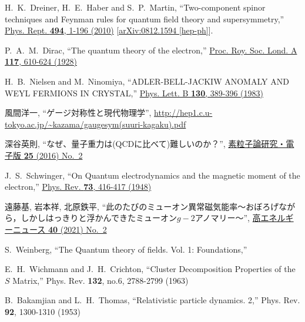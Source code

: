 \documentclass[10pt,a4paper]{jarticle}
\begin{document}
\begin{thebibliography}{99}
H.~K.~Dreiner, H.~E.~Haber and S.~P.~Martin,
``Two-component spinor techniques and Feynman rules for quantum field theory and supersymmetry,''
\href{https://doi.org/10.1016/j.physrep.2010.05.002}{Phys. Rept. \textbf{494}, 1-196 (2010)}
[\href{https://arxiv.org/abs/0812.1594}{arXiv:0812.1594 [hep-ph]}].

P.~A.~M.~Dirac,
``The quantum theory of the electron,''
\href{https://doi.org/10.1098/rspa.1928.0023}{Proc. Roy. Soc. Lond. A \textbf{117}, 610-624 (1928)}

H.~B.~Nielsen and M.~Ninomiya,
``ADLER-BELL-JACKIW ANOMALY AND WEYL FERMIONS IN CRYSTAL,''
\href{https://doi.org/10.1016/0370-2693(83)91529-0}{Phys. Lett. B \textbf{130}, 389-396 (1983)}

風間洋一, ``ゲージ対称性と現代物理学'',
\url{http://hep1.c.u-tokyo.ac.jp/~kazama/gaugesym(suuri-kagaku).pdf}

深谷英則, ``なぜ、量子重力は(QCDに比べて)難しいのか？'',
\href{http://www2.yukawa.kyoto-u.ac.jp/~soken.editorial/sokendenshi/vol25/sokendenshi_2016_25_2.html}
{素粒子論研究・電子版 \textbf{25} (2016) No.~2}

J.~S.~Schwinger,
``On Quantum electrodynamics and the magnetic moment of the electron,''
\href{https://doi.org/10.1103/PhysRev.73.416}{Phys. Rev. \textbf{73}, 416-417 (1948)}

遠藤基, 岩本祥, 北原鉄平,
``此のたびのミューオン異常磁気能率〜おぼろげながら，しかしはっきりと浮かんできたミューオン$g-2$アノマリー〜'',
\href{http://www.jahep.org/hepnews/2021/40-2-2-g2.pdf}{高エネルギーニュース \textbf{40} (2021) No.~2}

S.~Weinberg,
``The Quantum theory of fields. Vol. 1: Foundations,''

E.~H.~Wichmann and J.~H.~Crichton,
``Cluster Decomposition Properties of the $S$ Matrix,''
Phys. Rev. \textbf{132}, no.6, 2788-2799 (1963)

B.~Bakamjian and L.~H.~Thomas,
``Relativistic particle dynamics. 2,''
Phys. Rev. \textbf{92}, 1300-1310 (1953)

\end{thebibliography}




%
%
\end{document}
